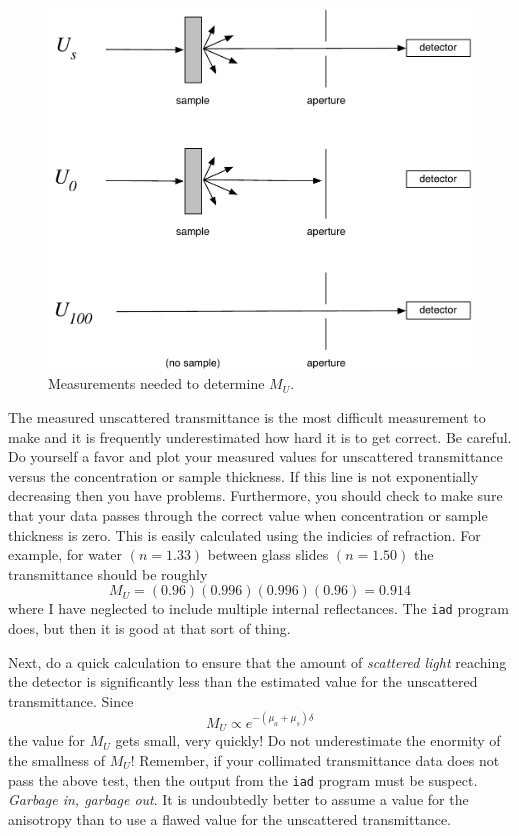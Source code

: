 \documentclass{article}
\newcommand\iadprog{\texttt{iad}}
\begin{document}
\begin{figure}[h!]
\begin{center}
\includegraphics[scale=0.5]{colltrans.pdf}
\end{center}
\caption{Measurements needed to determine $M_U$.  }
\label{figeqmu}
\end{figure}

The measured unscattered transmittance is the most difficult measurement to make and
it is frequently underestimated how hard it is to get correct.  Be careful.  Do yourself a favor
and plot your measured values for unscattered transmittance versus
the concentration or sample thickness.  If this line is not exponentially decreasing
then you have problems.  Furthermore, you should check to make sure
that your data passes through the correct value when concentration or
sample thickness is zero.  This is easily calculated using the 
indicies of refraction.  For example, for water $(n=1.33)$ between glass slides
$(n=1.50)$ the transmittance should be roughly
$$
M_U = (0.96)(0.996)(0.996)(0.96)=0.914
$$
where I have neglected to include multiple internal reflectances.  The \iadprog{}
program does, but then it is good at that sort of thing.

Next, do a quick calculation to ensure that the amount of 
\textit{scattered light} reaching the detector is significantly less than
the estimated value for the unscattered transmittance.  Since
$$
M_U \propto e^{-(\mu_a+\mu_s) \delta}
$$ 
the value for $M_U$ gets small, very quickly!  Do
not underestimate the enormity of the smallness of $M_U$!
Remember, if your collimated transmittance data does not pass the 
above test, then the output from the \iadprog{} program must be suspect.
\emph{Garbage in, garbage out}.  It is undoubtedly better to assume
a value for the anisotropy than to use a flawed value for the
unscattered transmittance.
\end{document}
